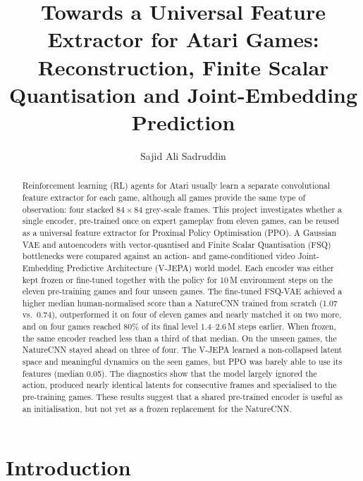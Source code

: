 \documentclass[runningheads,a4paper]{llncs}
\begin{document}
\title{Towards a Universal Feature Extractor for Atari Games:
Reconstruction, Finite Scalar Quantisation and Joint-Embedding Prediction}

\author{Sajid Ali Sadruddin}

\maketitle

\begin{abstract}
Reinforcement learning (RL) agents for Atari usually learn a separate convolutional feature
extractor for each game, although all games provide the same type of observation: four
stacked $84\times84$ grey-scale frames. This project investigates whether a single
encoder, pre-trained once on expert gameplay from eleven games, can be reused as a universal
feature extractor for Proximal Policy Optimisation (PPO). A Gaussian VAE and
autoencoders with vector-quantised and Finite Scalar Quantisation (FSQ) bottlenecks were compared against an
action- and game-conditioned video Joint-Embedding Predictive Architecture (V-JEPA) world model. Each
encoder was either kept frozen or fine-tuned together with the policy for 10\,M environment
steps on the eleven pre-training games and four unseen games. The fine-tuned FSQ-VAE achieved a
higher median human-normalised score than a NatureCNN trained from scratch (1.07 vs.\ 0.74),
outperformed it on four of eleven games and nearly matched it on two more, and on four games
reached 80\% of its final level 1.4--2.6\,M steps earlier. When frozen, the same encoder
reached less than a third of that median. On the unseen games, the NatureCNN stayed ahead on
three of four. The V-JEPA
learned a non-collapsed latent space and meaningful dynamics on the seen games, but PPO was
barely able to use its features (median 0.05). The diagnostics show that the model largely
ignored the action, produced nearly identical latents for consecutive frames and specialised
to the pre-training games. These results suggest that a shared pre-trained encoder is useful
as an initialisation, but not yet as a frozen replacement for the NatureCNN.
\end{abstract}

\section{Introduction}
\label{sec:intro}
\end{document}
